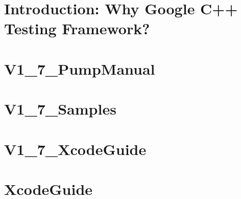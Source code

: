 \documentclass[twoside]{book}
\newcommand{\+}{\discretionary{\mbox{\scriptsize$\hookleftarrow$}}{}{}}
\begin{document}
\chapter{Introduction\+: Why Google C++ Testing Framework?}
\label{md___users_fjp_git_bachelor_bachelor-master_updated_vfinal_googletest-1_88_80_googletest_docs__v1_7__primer}

\chapter{V1\+\_\+7\+\_\+\+Pump\+Manual}
\label{md___users_fjp_git_bachelor_bachelor-master_updated_vfinal_googletest-1_88_80_googletest_docs__v1_7__pump_manual}

\chapter{V1\+\_\+7\+\_\+\+Samples}
\label{md___users_fjp_git_bachelor_bachelor-master_updated_vfinal_googletest-1_88_80_googletest_docs__v1_7__samples}

\chapter{V1\+\_\+7\+\_\+\+Xcode\+Guide}
\label{md___users_fjp_git_bachelor_bachelor-master_updated_vfinal_googletest-1_88_80_googletest_docs__v1_7__xcode_guide}

\chapter{Xcode\+Guide}
\label{md___users_fjp_git_bachelor_bachelor-master_updated_vfinal_googletest-1_88_80_googletest_docs__xcode_guide}

\end{document}

